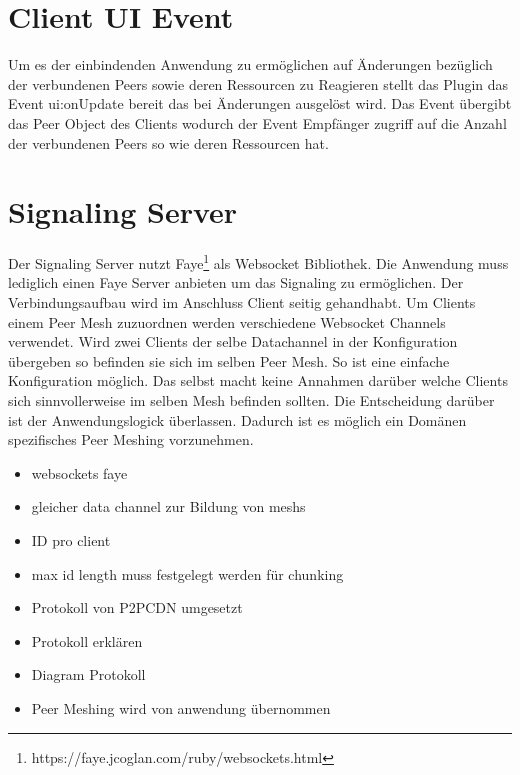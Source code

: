 \section{Client UI Event}
Um es der einbindenden Anwendung zu ermöglichen auf Änderungen bezüglich der verbundenen Peers sowie deren Ressourcen zu Reagieren stellt das Plugin das Event ui:onUpdate bereit das bei Änderungen ausgelöst wird. Das Event übergibt das Peer Object des Clients wodurch der Event Empfänger zugriff auf die Anzahl der verbundenen Peers so wie deren Ressourcen hat. 

\section{Signaling Server}
Der Signaling Server nutzt Faye\footnote{https://faye.jcoglan.com/ruby/websockets.html} als Websocket Bibliothek. Die Anwendung muss lediglich einen Faye Server anbieten um das Signaling zu ermöglichen. Der Verbindungsaufbau wird im Anschluss Client seitig gehandhabt. 
Um Clients einem Peer Mesh zuzuordnen werden verschiedene Websocket Channels verwendet. Wird zwei Clients der selbe Datachannel in der Konfiguration übergeben so befinden sie sich im selben Peer Mesh. So ist eine einfache Konfiguration möglich. Das \cdn selbst macht keine Annahmen darüber welche Clients sich sinnvollerweise im selben Mesh befinden sollten. Die Entscheidung darüber ist der Anwendungslogick überlassen. Dadurch ist es möglich ein Domänen spezifisches Peer Meshing vorzunehmen.

\begin{itemize}
  \item websockets faye
  \item gleicher data channel zur Bildung von meshs
  \item ID pro client
  \item max id length muss festgelegt werden für chunking
  \item Protokoll von P2PCDN umgesetzt
  \item Protokoll erklären
  \item Diagram Protokoll
  \item Peer Meshing wird von anwendung übernommen
\end{itemize}

